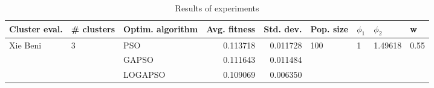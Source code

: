 \begin{table}
\centering
\caption{Results of experiments}
\begin{tabular}{lllrrllll}
\toprule
            Cluster eval. &        \# clusters & Optim. algorithm &  Avg. fitness &  Std. dev. &            Pop. size &         $\phi_{1}$ &               $\phi_{2}$ &                     w \\
\midrule
\multirow{3}{*}{Xie Beni} & \multirow{3}{*}{3} &              PSO &      0.113718 &   0.011728 & \multirow{3}{*}{100} & \multirow{3}{*}{1} & \multirow{3}{*}{1.49618} & \multirow{3}{*}{0.55} \\
                          &                    &            GAPSO &      0.111643 &   0.011484 &                      &                    &                          &                       \\
                          &                    &          LOGAPSO &      0.109069 &   0.006350 &                      &                    &                          &                       \\
\bottomrule
\end{tabular}
\end{table}
